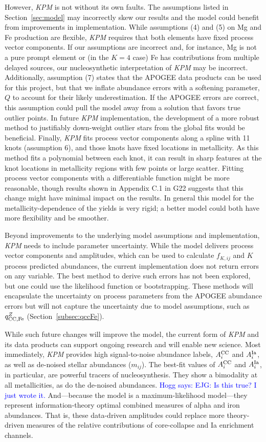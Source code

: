 \documentclass[modern]{aastex631}
\newcommand{\qccFe}{q_{{\rm CC, Fe}}^{Z}}
\newcommand{\Acc}{A^{\rm CC}_{i}}
\newcommand{\AIa}{A^{\rm Ia}_{i}}
\newcommand{\hogg}[1]{\textcolor{blue}{Hogg says: #1}}
\newcommand{\name}{\textsl{KPM}}
\begin{document}
However, \name{} is not without its own faults. The assumptions listed in Section~\ref{sec:model} may incorrectly skew our results and the model could benefit from improvements in implementation. While assumptions (4) and (5) on Mg and Fe production are flexible, \name{} requires that both elements have fixed process vector components. If our assumptions are incorrect and, for instance, Mg is not a pure prompt element or (in the $K=4$ case)  Fe has contributions from multiple delayed sources, our nucleosynthetic interpretation of \name{} may be incorrect. Additionally, assumption (7) states that the APOGEE data products can be used for this project, but that we inflate abundance errors with a softening parameter, $Q$ to account for their likely underestimation. If the APOGEE errors are correct, this assumption could pull the model away from a solution that favors true outlier points. In future \name{} implementation, the development of a more robust method to justifiably down-weight outlier stars from the global fits would be beneficial.
Finally, \name{} fits process vector components along a spline with 11 knots (assumption 6), and those knots have fixed locations in metallicity.
As this method fits a polynomial between each knot, it can result in sharp features at the knot locations in metallicity regions with few points or large scatter. Fitting process vector components with a differentiable function might be more reasonable, though results shown in Appendix C.1 in G22 suggests that this change might have minimal impact on the results. 
In general this model for the metallicity-dependence of the yields is very rigid; a better model could both have more flexibility and be smoother.

Beyond improvements to the underlying model assumptions and implementation, \name{} needs to include parameter uncertainty. While the model delivers process vector components and amplitudes, which can be used to calculate $f_{K, ij}$ and $K$ process predicted abundances, the current implementation does not return errors on any variable. The best method to derive such errors has not been explored, but one could use the likelihood function or bootstrapping. These methods will encapsulate the uncertainty on process parameters from the APOGEE abundance errors but will not capture the uncertainty due to model assumptions, such as $\qccFe$ (Section~\ref{subsec:qccFe}). 

While such future changes will improve the model, the current form of \name{} and its data products can support ongoing research and will enable new science.
Most immediately, \name{} provides high signal-to-noise abundance labels, $\Acc$ and $\AIa$, as well as de-noised stellar abundances ($m_{ij}$).
The best-fit values of $\Acc$ and $\AIa$, in particular, are powerful tracers of nucleosynthesis.
They show a bimodality at all metallicities, as do the de-noised abundances. \hogg{EJG: Is this true? I just wrote it.}
And---because the model is a maximum-likelihood model---they represent information-theory optimal combined measures of alpha  and iron abundances.
That is, these data-driven amplitudes could replace more theory-driven measures of the relative contributions of core-collapse and Ia enrichment channels.
\end{document}
